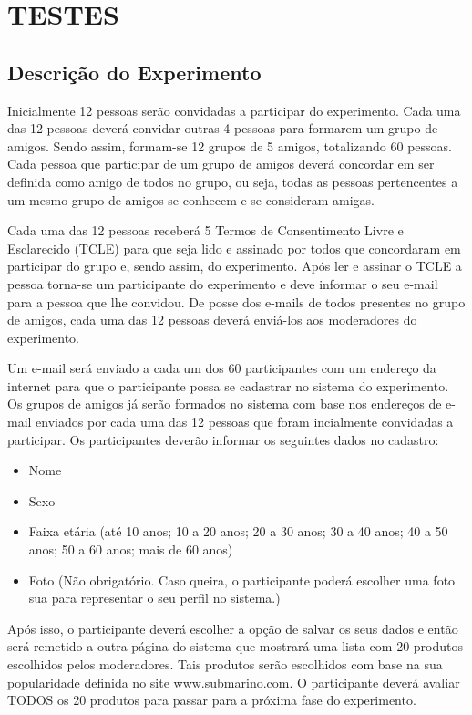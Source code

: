 \chapter{TESTES} %
\label{cha:testes} %

\section{Descrição do Experimento}
\label{cha:descricao_do_experimento}

 Inicialmente 12 pessoas serão convidadas a participar do experimento. Cada uma das 12 pessoas deverá convidar outras 4 pessoas para formarem um grupo de amigos. Sendo assim, formam-se 12 grupos de 5 amigos, totalizando 60 pessoas. Cada pessoa que participar de um grupo de amigos deverá concordar em ser definida como amigo de todos no grupo, ou seja, todas as pessoas pertencentes a um mesmo grupo de amigos se conhecem e se consideram amigas.

 Cada uma das 12 pessoas receberá 5 Termos de Consentimento Livre e Esclarecido (TCLE) para que seja lido e assinado por todos que concordaram em participar do grupo e, sendo assim, do experimento. Após ler e assinar o TCLE a pessoa torna-se um participante do experimento e deve informar o seu e-mail para a pessoa que lhe convidou. De posse dos e-mails de todos presentes no grupo de amigos, cada uma das 12 pessoas deverá enviá-los aos moderadores do experimento.

 Um e-mail será enviado a cada um dos 60 participantes com um endereço da internet para que o participante possa se cadastrar no sistema do experimento. Os grupos de amigos já serão formados no sistema com base nos endereços de e-mail enviados por cada uma das 12 pessoas que foram incialmente convidadas a participar. Os participantes deverão informar os seguintes dados no cadastro:

\begin{itemize}
	\item Nome
	\item Sexo
	\item Faixa etária (até 10 anos; 10 a 20 anos; 20 a 30 anos; 30 a 40 anos; 40 a 50 anos; 50 a 60 anos; mais de 60 anos)
	\item Foto (Não obrigatório. Caso queira, o participante poderá escolher uma foto sua para representar o seu perfil no sistema.)
\end{itemize}

 Após isso, o participante deverá escolher a opção de salvar os seus dados e então será remetido a outra página do sistema que mostrará uma lista com 20 produtos escolhidos pelos moderadores. Tais produtos serão escolhidos com base na sua popularidade definida no site www.submarino.com. O participante deverá avaliar TODOS os 20 produtos para passar para a próxima fase do experimento.


